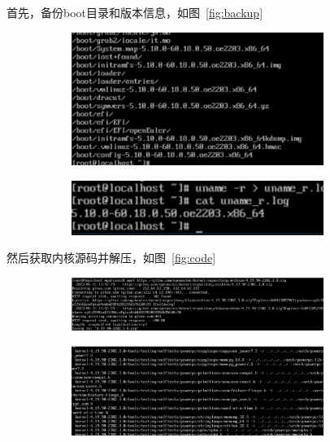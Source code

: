 \documentclass[a4paper,twoside]{article}
\begin{document}
\begin{spacing}{1.2}
首先，备份boot目录和版本信息，如图~\ref*{fig:backup}
\begin{figure}[H]
	\centering
	\caption{备份}
	\label{fig:backup}
	\begin{subfigure}{0.45\textwidth}
		\centering
		\includegraphics*[width=0.9\textwidth]{1.png}
	\end{subfigure}
	\begin{subfigure}{0.45\textwidth}
		\centering
		\includegraphics*[width=0.9\textwidth]{2.png}
	\end{subfigure}
\end{figure}
然后获取内核源码并解压，如图~\ref{fig:code}
\begin{figure}[H]
	\centering
	\caption{获取内核源码并解压}
	\label{fig:code}
	\begin{subfigure}{0.45\textwidth}
		\centering
		\includegraphics*[width=0.9\textwidth]{3.png}
	\end{subfigure}
	\begin{subfigure}{0.45\textwidth}
		\centering
		\includegraphics*[width=0.9\textwidth]{4.png}

\end{subfigure}
\end{figure}
\end{spacing}
\end{document}
